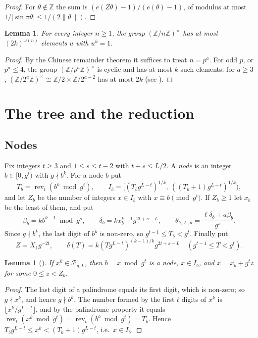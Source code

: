 \documentclass[11pt]{amsart}
\newtheorem{lemma}[theorem]{Lemma}
\theoremstyle{definition}
\numberwithin{equation}{section}
\newcommand{\cP}{\mathcal{P}}
\newcommand{\rev}{\operatorname{rev}}
\newcommand{\Z}{\mathbb{Z}}
\begin{document}
\begin{proof}
For $\theta\notin\Z$ the sum is $(e(Z\theta)-1)/(e(\theta)-1)$, of modulus at
most $1/|\sin\pi\theta|\le1/(2\|\theta\|)$.
\end{proof}

\begin{lemma}\label{lem:roots}
For every integer $n\ge1$, the group $(\Z/n\Z)^\times$ has at most
$(2k)^{\omega(n)}$ elements $u$ with $u^k=1$.
\end{lemma}

\begin{proof}
By the Chinese remainder theorem it suffices to treat $n=p^a$. For odd $p$,
or $p^a\le4$, the group $(\Z/p^a\Z)^\times$ is cyclic and has at most $k$
such elements; for $a\ge3$, $(\Z/2^a\Z)^\times\cong\Z/2\times\Z/2^{a-2}$ has
at most $2k$ (see \cite[Chapter~4]{IR}).
\end{proof}

\section{The tree and the reduction}\label{sec:reduction}

\subsection{Nodes}
Fix integers $t\ge3$ and $1\le s\le t-2$ with $t+s\le L/2$. A \emph{node}
is an integer $b\in[0,g^t)$ with $g\nmid b^k$. For a node $b$ put
\[
T_b=\rev_t(b^k\bmod g^t),\qquad
I_b=\bigl[(T_bg^{L-t})^{1/k},\ ((T_b+1)g^{L-t})^{1/k}\bigr),
\]
and let $Z_b$ be the number of integers $x\in I_b$ with $x\equiv b\pmod{g^t}$.
If $Z_b\ge1$ let $x_b$ be the least of them, and put
\[
\beta_b=kb^{k-1}\bmod g^s,\qquad\delta_b=kx_b^{k-1}g^{2t+s-L},\qquad
\theta_{b,\ell,a}=\frac{\ell\delta_b+a\beta_b}{g^s}.
\]
Since $g\nmid b^k$, the last digit of $b^k$ is non-zero, so
$g^{t-1}\le T_b<g^t$. Finally put
\[
Z=X_1g^{-2t},\qquad \delta(T)=k(Tg^{L-t})^{(k-1)/k}g^{2t+s-L}\quad(g^{t-1}\le T<g^t).
\]

\begin{lemma}[\cite{CLS}]\label{lem:tree}
If $x^k\in\cP_{g,L}$, then $b=x\bmod g^t$ is a node, $x\in I_b$, and
$x=x_b+g^tz$ for some $0\le z<Z_b$.
\end{lemma}

\begin{proof}
The last digit of a palindrome equals its first digit, which is non-zero;
so $g\nmid x^k$, and hence $g\nmid b^k$. The number formed by the first $t$
digits of $x^k$ is $\lfloor x^k/g^{L-t}\rfloor$, and by the palindrome
property it equals $\rev_t(x^k\bmod g^t)=\rev_t(b^k\bmod g^t)=T_b$. Hence
$T_bg^{L-t}\le x^k<(T_b+1)g^{L-t}$, i.e.\ $x\in I_b$.
\end{proof}
\end{document}

